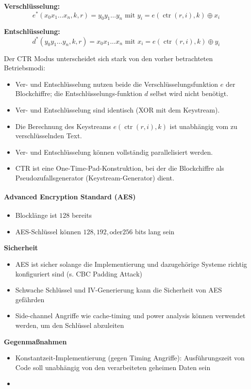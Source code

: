 \documentclass[
../../css_summary.tex,
]
{subfiles}
\begin{document}
\textbf{Verschlüsselung:}
\[
   e^*(x_0 x_1 \dots x_n, k, r) = y_0 y_1 \dots y_n \text{ mit } y_i = e(\operatorname{ctr}(r, i), k) \oplus x_i
\]

\textbf{Entschlüsselung:}
\[
   d^*(y_0 y_1 \dots y_n, k, r) = x_0 x_1 \dots x_n \text{ mit } x_i = e(\operatorname{ctr}(r, i), k) \oplus y_i
\]

Der CTR Modus unterscheidet sich stark von den vorher betrachteten Betriebsmodi:
\begin{itemize}
   \item Ver- und Entschlüsselung nutzen beide die Verschlüsselungsfunktion $e$ der Blockchiffre; die Entschlüsselungs-funktion $d$ selbst wird nicht benötigt.
   \item Ver- und Entschlüsselung sind identisch (XOR mit dem Keystream).
   \item Die Berechnung des Keystreams $e(\operatorname{ctr}(r,i),k)$ ist unabhängig vom zu verschlüsselnden Text.
   \item Ver- und Entschlüsselung können vollständig parallelisiert werden.
   \item CTR ist eine One-Time-Pad-Konstruktion, bei der die Blockchiffre als Pseudozufallsgenerator (Keystream-Generator) dient.
\end{itemize}
\paragraph{Advanced Encryption Standard (AES)}
\begin{itemize}
   \item Blocklänge ist $128$ bereits
   \item AES-Schlüssel können $128, 192, \text{oder} 256$ bits lang sein
\end{itemize}

\textbf{Sicherheit}
\begin{itemize}
   \item AES ist sicher solange die Implementierung und dazugehörige Systeme richtig konfiguriert sind (s. CBC Padding Attack)
   \item Schwache Schlüssel und IV-Generierung kann die Sicherheit von AES gefährden
   \item Side-channel Angriffe wie cache-timing und power analysis können verwendet werden, um den Schlüssel abzuleiten
\end{itemize}

\textbf{Gegenmaßnahmen}
\begin{itemize}
   \item Konstantzeit-Implementierung (gegen Timing Angriffe): Ausführungszeit von Code soll unabhängig von den verarbeiteten geheimen Daten sein
   \item
\end{itemize}
\end{document}
